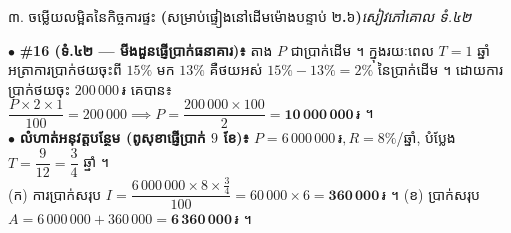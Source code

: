 \documentclass[a4paper,10pt]{article}
\newcommand{\enbf}[1]{{\TimesEn\bfseries #1}}
\newcommand{\riel}{\,\text{៛}}
\newcommand{\secstrip}[2]{%
  \vspace{3pt}%
  \begin{tcolorbox}[
    enhanced, sharp corners, colback=panelgray, colframe=black,
    boxrule=0.8pt, boxsep=0.8pt, top=2pt, bottom=2pt, left=5pt, right=5pt,
    after skip=3pt
  ]
    {\muol\fontsize{8.5pt}{12.2pt}\selectfont #1}\hfill{\fontsize{7.8pt}{10.8pt}\selectfont\textit{#2}}
  \end{tcolorbox}%
}
\begin{document}
\vspace{4pt}
\secstrip{៣. ចម្លើយលម្អិតនៃកិច្ចការផ្ទះ \enbf{(}សម្រាប់ផ្ទៀងនៅដើមម៉ោងបន្ទាប់ ២\enbf{.}៦\enbf{)}}{សៀវភៅគោល ទំ.៤២}

\begin{tcolorbox}[
  enhanced, sharp corners, colback=white, colframe=black,
  boxrule=0.8pt, boxsep=2pt, top=4pt, bottom=4pt, left=6pt, right=6pt
]
  \fontsize{8.9pt}{13.5pt}\selectfont
  $\bullet$ \textbf{\#16 (ទំ.៤២ — មីងដួនផ្ញើប្រាក់ធនាគារ)៖} តាង $P$ ជាប្រាក់ដើម ។ ក្នុងរយៈពេល $T = 1$ ឆ្នាំ អត្រាការប្រាក់ថយចុះពី $15\%$ មក $13\%$ គឺថយអស់ $15\% - 13\% = 2\%$ នៃប្រាក់ដើម ។ ដោយការប្រាក់ថយចុះ $200\,000\riel$ គេបាន៖ $\dfrac{P \times 2 \times 1}{100} = 200\,000 \implies P = \dfrac{200\,000 \times 100}{2} = \mathbf{10\,000\,000\riel}$ ។\\[3pt]
  $\bullet$ \textbf{លំហាត់អនុវត្តបន្ថែម (ពូសុខាផ្ញើប្រាក់ $9$ ខែ)៖} $P = 6\,000\,000\riel, R = 8\%$/ឆ្នាំ, បំប្លែង $T = \dfrac{9}{12} = \dfrac{3}{4}$ ឆ្នាំ ។\\
  (ក) ការប្រាក់សរុប $I = \dfrac{6\,000\,000 \times 8 \times \frac{3}{4}}{100} = 60\,000 \times 6 = \mathbf{360\,000\riel}$ ។ \quad
  (ខ) ប្រាក់សរុប $A = 6\,000\,000 + 360\,000 = \mathbf{6\,360\,000\riel}$ ។
\end{tcolorbox}
\end{document}
